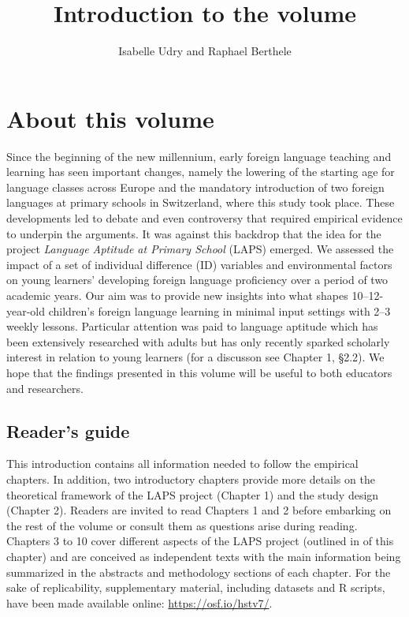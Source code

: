 \documentclass[output=paper]{langsci/langscibook}
\author{Isabelle Udry\affiliation{University of Fribourg, Institut de Plurilinguisme; Zurich University of Teacher Education} and Raphael Berthele\affiliation{University of Fribourg, Institut de Plurilinguisme}}
\title{Introduction to the volume}
\begin{document}
\maketitle 

\section{About this volume}

Since the beginning of the new millennium, early foreign language teaching and learning has seen important changes, namely the lowering of the starting age for language classes across Europe and the mandatory introduction of two foreign languages at primary schools in Switzerland, where this study took place. These developments led to debate and even controversy that required empirical evidence to underpin the arguments. It was against this backdrop that the idea for the project \textit{Language Aptitude at Primary School} (LAPS) emerged. We assessed the impact of a set of individual difference (ID) variables and environmental factors on young learners’ developing foreign language proficiency over a period of two academic years. Our aim was to provide new insights into what shapes 10--12-year-old children’s foreign language learning in minimal input settings with 2--3 weekly lessons. Particular attention was paid to language aptitude which has been extensively researched with adults but has only recently sparked scholarly interest in relation to young learners (for a discusson see Chapter 1, §2.2). We hope that the findings presented in this volume will be useful to both educators and researchers. 

\subsection{Reader’s guide}

This introduction contains all information needed to follow the empirical chapters. In addition, two introductory chapters provide more details on the theoretical framework of the LAPS project (Chapter 1) and the study design (Chapter 2). Readers are invited to read Chapters 1 and 2 before embarking on the rest of the volume or consult them as questions arise during reading. Chapters 3 to 10 cover different aspects of the LAPS project (outlined in  of this chapter) and are conceived as independent texts with the main information being summarized in the abstracts and methodology sections of each chapter. For the sake of replicability, supplementary material, including datasets and R scripts, have been made available online: \url{https://osf.io/hstv7/}.
\end{document}
